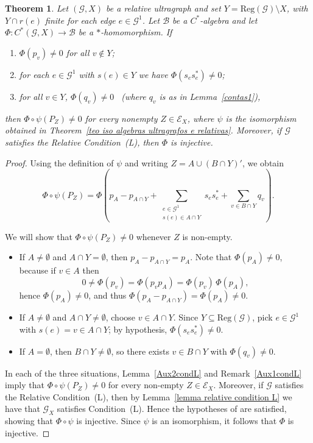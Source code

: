 \documentclass[12pt, reqno]{amsart}
\newtheorem{theorem}{Theorem}[section]
\theoremstyle{definition}
\theoremstyle{remark}
\numberwithin{equation}{section}
\begin{document}
\begin{theorem}\label{Relative condition (L) implies injective}
Let $(\mathcal{G},X)$ be a relative ultragraph and set $Y=\mathrm{Reg}(\mathcal{G})\setminus X$,
with $Y\cap r(e)$ finite for each edge $e\in\mathcal{G}^1$. Let $\mathcal{B}$ be a $C^*$-algebra
and let $\Phi:C^*(\mathcal{G},X)\to \mathcal{B}$ be a $*$-homomorphism. If
\begin{enumerate}
    \item $\Phi(p_v)\neq 0$ for all $v\notin Y$;
    \item for each $e\in\mathcal{G}^1$ with $s(e)\in Y$ we have $\Phi(s_e s_e^*)\neq 0$;
    \item for all $v\in Y$, $\Phi(q_v)\neq 0$ \ (where $q_v$ is as in Lemma~\ref{contas1}),
\end{enumerate}
then $\Phi\circ\psi(P_Z)\neq 0$ for every nonempty $Z\in\mathcal{E}_X$, where $\psi$ is the
isomorphism obtained in Theorem~\ref{teo iso algebras ultragrafos e relativas}. Moreover, if
$\mathcal{G}$ satisfies the Relative Condition~(L), then $\Phi$ is injective.
\end{theorem}


\begin{proof}
Using the definition of $\psi$ and writing $Z = A \cup (B \cap Y)'$, we obtain
\[
\Phi \circ \psi(P_Z)
=
\Phi\!\left(
p_A - p_{A \cap Y}
+ \sum_{\substack{e \in \mathcal{G}^1 \\ s(e) \in A \cap Y}} s_e s_e^*
+ \sum_{v \in B \cap Y} q_v
\right).
\]

We will show that $\Phi \circ \psi(P_Z) \neq 0$ whenever $Z$ is non-empty.
\begin{itemize}
    \item If $A \neq \emptyset$ and $A \cap Y = \emptyset$, then $p_A - p_{A \cap Y} = p_A$. Note that $\Phi(p_A) \neq 0$, because if $v \in A$ then
    \[
    0 \neq \Phi(p_v) = \Phi(p_v p_A) = \Phi(p_v)\,\Phi(p_A),
    \]
    hence $\Phi(p_A) \neq 0$, and thus $\Phi(p_A - p_{A \cap Y}) = \Phi(p_A) \neq 0$.
    \item If $A \neq \emptyset$ and $A \cap Y \neq \emptyset$, choose $v \in A \cap Y$. Since $Y \subseteq \mathrm{Reg}(\mathcal{G})$, pick $e \in \mathcal{G}^1$ with $s(e) = v \in A \cap Y$; by hypothesis, $\Phi(s_e s_e^*) \neq 0$.
    \item If $A = \emptyset$, then $B \cap Y \neq \emptyset$, so there exists $v \in B \cap Y$ with $\Phi(q_v) \neq 0$.
\end{itemize}

In each of the three situations, Lemma~\ref{Aux2condL} and Remark~\ref{Aux1condL} imply that
$\Phi \circ \psi(P_Z) \neq 0$ for every non-empty $Z \in \mathcal{E}_X$. Moreover, if
$\mathcal{G}$ satisfies the Relative Condition~(L), then by
Lemma~\ref{lemma relative condition L} we have that $\mathcal{G}_X$ satisfies Condition~(L).
Hence the hypotheses of \cite[Theorem~6.7]{Tom2} are satisfied, showing that $\Phi \circ \psi$
is injective. Since $\psi$ is an isomorphism, it follows that $\Phi$ is injective.
\end{proof}
\end{document}
